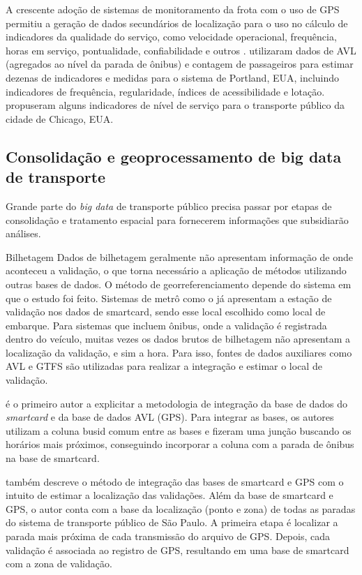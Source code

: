 \documentclass[        
    a4paper,          %
    12pt,             %
    chapter=TITLE,    %
    section=Title,    %
    subsection=Title, %
    oneside,          %
    english,          %
    spanish,          %
    brazil,           %
    fleqn             %
]{abntex2}
\begin{document}
  A crescente adoção de sistemas de monitoramento da frota com o uso de GPS permitiu a geração de dados secundários de localização para o uso no cálculo de indicadores da qualidade do serviço, como velocidade operacional, frequência, horas em serviço, pontualidade, confiabilidade e outros \citep{Brinckerhoff2013}. \citet{Bertini2003} utilizaram dados de AVL (agregados ao nível da parada de ônibus) e contagem de passageiros para estimar dezenas de indicadores e medidas para o sistema de Portland, EUA, incluindo indicadores de frequência, regularidade, índices de acessibilidade e lotação. \citet{Utsunomiya2006} propuseram alguns indicadores de nível de serviço para o transporte público da cidade de Chicago, EUA.
  
  \hypertarget{consolidacao-e-geoprocessamento-de-big-data-de-transporte}{%
  \subsection{Consolidação e geoprocessamento de big data de transporte}\label{consolidacao-e-geoprocessamento-de-big-data-de-transporte}}
  
  Grande parte do \emph{big data} de transporte público precisa passar por etapas de consolidação e tratamento espacial para fornecerem informações que subsidiarão análises.
  
  Bilhetagem
  Dados de bilhetagem geralmente não apresentam informação de onde aconteceu a validação, o que torna necessário a aplicação de métodos utilizando outras bases de dados. O método de georreferenciamento depende do sistema em que o estudo foi feito. Sistemas de metrô como o \citet{Barry2002} já apresentam a estação de validação nos dados de smartcard, sendo esse local escolhido como local de embarque. Para sistemas que incluem ônibus, onde a validação é registrada dentro do veículo, muitas vezes os dados brutos de bilhetagem não apresentam a localização da validação, e sim a hora. Para isso, fontes de dados auxiliares como AVL e GTFS são utilizadas para realizar a integração e estimar o local de validação.
  
  \citet{Zhao2007} é o primeiro autor a explicitar a metodologia de integração da base de dados do \emph{smartcard} e da base de dados AVL (GPS). Para integrar as bases, os autores utilizam a coluna busid comum entre as bases e fizeram uma junção buscando os horários mais próximos, conseguindo incorporar a coluna com a parada de ônibus na base de smartcard.
  
  \citet{Farzin2008} também descreve o método de integração das bases de smartcard e GPS com o intuito de estimar a localização das validações. Além da base de smartcard e GPS, o autor conta com a base da localização (ponto e zona) de todas as paradas do sistema de transporte público de São Paulo. A primeira etapa é localizar a parada mais próxima de cada transmissão do arquivo de GPS. Depois, cada validação é associada ao registro de GPS, resultando em uma base de smartcard com a zona de validação.
  
\end{document}
